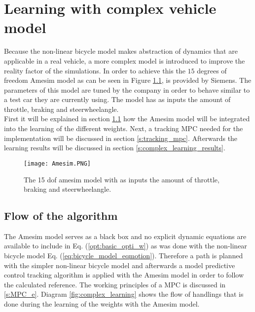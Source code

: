\chapter{Learning with complex vehicle model}
\label{cha:Tracking_MPC}


Because the non-linear bicycle model makes abstraction of dynamics that are applicable in a real vehicle, a more complex model is introduced to improve the reality factor of the simulations. In order to achieve this the $15$ degrees of freedom Amesim model as can be seen in Figure \ref{fig:Amesim}, is provided by Siemens. The parameters of this model are tuned by the company in order to behave similar to a test car they are currently using. The model has as inputs the amount of throttle, braking and steerwheelangle.\\

First it will be explained in section \ref{s:flow of the algorithm} how the Amesim model will be integrated into the learning of the different weights. Next, a tracking MPC needed for the implementation will be discussed in section \ref{s:tracking_mpc}. Afterwards the learning results will be discussed in section \ref{s:complex_learning_results}.

\begin{figure}[h!]
	\centering
	\texttt{[image: Amesim.PNG]}
	\caption{The 15 dof amesim model with as inputs the amount of throttle, braking and steerwheelangle.}	
	\label{fig:Amesim}
\end{figure}
\newpage
\section{Flow of the algorithm}
\label{s:flow of the algorithm}
The Amesim model serves as a black box and no explicit dynamic equations are available 
to include in Eq. (\ref{opt:basic_opti_w}) as was done with the non-linear bicycle model Eq. (\ref{eq:bicycle_model_eqmotion}). Therefore a path is planned with the simpler non-linear bicycle model and afterwards a model predictive control tracking algorithm is applied with the Amesim model in order to follow the calculated reference. The working principles of a MPC is discussed in \ref{s:MPC_e}. Diagram \ref{fig:complex_learning} shows the flow of handlings that is done during the learning of the weights with the Amesim model.

